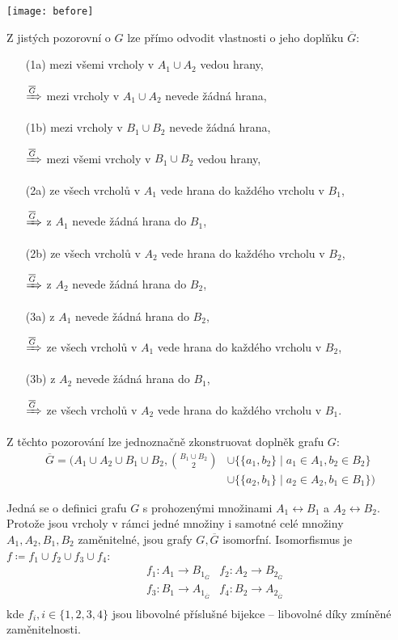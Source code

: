 \documentclass{article}
\begin{document}
\begin{center}
    \texttt{[image: before]}
\end{center}

Z jistých pozorovní o $G$ lze přímo odvodit vlastnosti o jeho doplňku $\overline{G}$:
\begin{itemize}[parsep=0pt, itemsep=0pt]
    \item[(1a)] mezi všemi vrcholy v $A_1 \cup A_2$ vedou hrany,
    \item[$\xRightarrow{\overline{G}}$] mezi vrcholy v $A_{1} \cup A_{2}$ nevede žádná hrana,
    \item[(1b)] mezi vrcholy v $B_1 \cup B_2$ nevede žádná hrana,
    \item[$\xRightarrow{\overline{G}}$] mezi všemi vrcholy v $B_{1} \cup B_{2}$ vedou hrany,
    \item[(2a)] ze všech vrcholů v $A_1$ vede hrana do každého vrcholu v $B_1$,
    \item[$\xRightarrow{\overline{G}}$] z $A_{1}$ nevede žádná hrana do $B_{1}$,
    \item[(2b)] ze všech vrcholů v $A_2$ vede hrana do každého vrcholu v $B_2$,
    \item[$\xRightarrow{\overline{G}}$] z $A_{2}$ nevede žádná hrana do $B_{2}$,
    \item[(3a)] z $A_1$ nevede žádná hrana do $B_2$,
    \item[$\xRightarrow{\overline{G}}$] ze všech vrcholů v $A_{1}$ vede hrana do každého vrcholu v $B_{2}$,
    \item[(3b)] z $A_2$ nevede žádná hrana do $B_1$,
    \item[$\xRightarrow{\overline{G}}$] ze všech vrcholů v $A_2$ vede hrana do každého vrcholu v $B_{1}$.
\end{itemize}

Z těchto pozorování lze jednoznačně zkonstruovat doplněk grafu $G$:
\begin{align*}
    \overline{G} = ( A_1 \cup A_2 \cup B_1 \cup B_2, \binom{B_1 \cup B_2}{2}
     & \cup \{ \{a_1, b_2\} \mid a_1 \in A_1, b_2 \in B_2 \} \\
     & \cup \{ \{a_2, b_1\} \mid a_2 \in A_2, b_1 \in B_1 \}
    )
\end{align*}

Jedná se o definici grafu $G$ s prohozenými množinami $A_1 \leftrightarrow B_1$ a $A_2 \leftrightarrow B_2$. Protože jsou vrcholy v rámci jedné množiny i samotné celé množiny $A_1, A_2, B_1, B_2$ zaměnitelné, jsou grafy $G, \overline{G}$ isomorfní. Isomorfismus je $f \coloneqq f_1 \cup f_2 \cup f_3 \cup f_4$:
\begin{align*}
     & f_1 : A_{1} \rightarrow B_{1_{\overline{G}}}
     & f_2 : A_{2} \rightarrow B_{2_{\overline{G}}} \\
     & f_3 : B_{1} \rightarrow A_{1_{\overline{G}}}
     & f_4 : B_{2} \rightarrow A_{2_{\overline{G}}} \\
\end{align*}
kde $f_i, i \in \{1, 2, 3, 4\}$ jsou libovolné příslušné bijekce -- libovolné díky zmíněné zaměnitelnosti.
\end{document}
